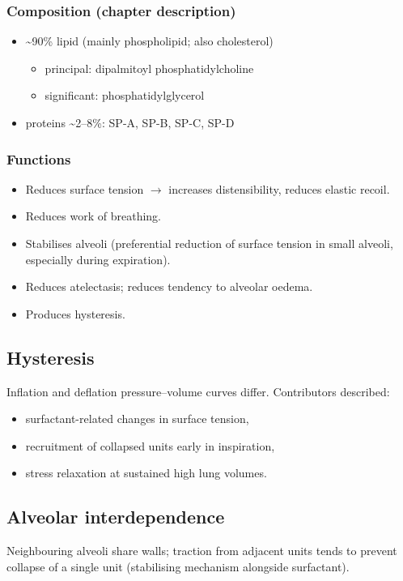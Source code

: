 \documentclass[11pt,a4paper]{article}
\begin{document}
\subsubsection{Composition (chapter description)}
\begin{itemize}
  \item \textasciitilde 90\% lipid (mainly phospholipid; also cholesterol)
  \begin{itemize}
    \item principal: dipalmitoyl phosphatidylcholine
    \item significant: phosphatidylglycerol
  \end{itemize}
  \item proteins \textasciitilde 2--8\%: SP-A, SP-B, SP-C, SP-D
\end{itemize}

\subsubsection{Functions}
\begin{itemize}
  \item Reduces surface tension $\rightarrow$ increases distensibility, reduces elastic recoil.
  \item Reduces work of breathing.
  \item Stabilises alveoli (preferential reduction of surface tension in small alveoli, especially during expiration).
  \item Reduces atelectasis; reduces tendency to alveolar oedema.
  \item Produces hysteresis.
\end{itemize}

\subsection{Hysteresis}
Inflation and deflation pressure--volume curves differ. Contributors described:
\begin{itemize}
  \item surfactant-related changes in surface tension,
  \item recruitment of collapsed units early in inspiration,
  \item stress relaxation at sustained high lung volumes.
\end{itemize}

\subsection{Alveolar interdependence}
Neighbouring alveoli share walls; traction from adjacent units tends to prevent collapse of a single unit (stabilising mechanism alongside surfactant).
\end{document}
